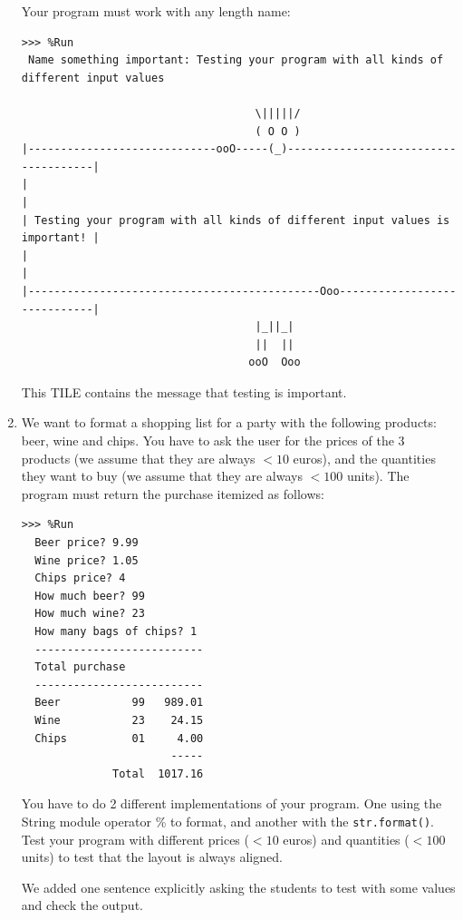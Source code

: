 \documentclass[
  fontsize=10pt,
  a4paper,
]{scrartcl}
\newenvironment{howTILEd}%
  {\begin{mdframed}[skipabove=10pt,skipbelow=10pt,backgroundcolor=pink!40]}%
  {\end{mdframed}}
\begin{document}
\begin{enumerate}
Your program must work with any length name:

\begin{Verbatim}[frame=none]
 >>> %Run
 Name something important: Testing your program with all kinds of different input values

                                    \|||||/                                   
                                    ( O O )                                    
|-----------------------------ooO-----(_)-------------------------------------|
|                                                                             |
| Testing your program with all kinds of different input values is important! |
|                                                                             |
|---------------------------------------------Ooo-----------------------------|
                                    |_||_|                                     
                                    ||  ||                                     
                                   ooO  Ooo                                                                               
\end{Verbatim}

\begin{howTILEd}
This TILE contains the message that testing is important.
\end{howTILEd}


\item We want to format a shopping list for a party with the following products: beer, wine and chips. You have to ask the user for the prices of the 3 products (we assume that they are always $< 10$ euros), and the quantities they want to buy (we assume that they are always $<100$ units). The program must return the purchase itemized as follows:

\begin{Verbatim}[frame=single, label={\em example test execution of the program}]
>>> %Run 
  Beer price? 9.99
  Wine price? 1.05
  Chips price? 4
  How much beer? 99
  How much wine? 23
  How many bags of chips? 1
  --------------------------
  Total purchase
  --------------------------
  Beer           99   989.01
  Wine           23    24.15
  Chips          01     4.00
                       -----
              Total  1017.16
\end{Verbatim}


You have to do 2 different implementations of your program. One using the String module operator \% to format, and another with the \verb|str.format()|. Test your program with different prices ($<10$ euros) and quantities ($<100$ units) to test that the layout is always aligned.

\begin{howTILEd}
We added one sentence explicitly asking the students to test with some values and check the output.
\end{howTILEd}




\end{enumerate}
\end{document}
